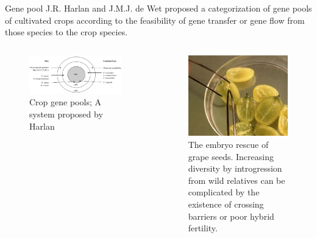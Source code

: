 \documentclass[11pt,ignorenonframetext,aspectratio=169]{beamer}
\newcommand{\bcolumns}{\begin{columns}[T, onlytextwidth]}
\newcommand{\ecolumns}{\end{columns}}
\begin{document}
\begin{frame}{Gene pool}
\protect\hypertarget{gene-pool}{}
J.R. Harlan and J.M.J. de Wet proposed a categorization of gene pools of
cultivated crops according to the feasibility of gene transfer or gene
flow from those species to the crop species.

\bcolumns


\begin{figure}
\includegraphics[width=0.95\textwidth, keepaspectratio,height=0.6\textheight]{./images/crop_gene_pools} \caption{Crop gene pools; A system proposed by Harlan}\label{fig:gene-pools}
\end{figure}


\begin{figure}
\includegraphics[width=0.98\linewidth]{./images/embryo_rescue} \caption{The embryo rescue of grape seeds. Increasing diversity by introgression from wild relatives can be complicated by the existence of crossing barriers or poor hybrid fertility.}\label{fig:embryo-resuce}
\end{figure}

\ecolumns
\end{frame}
\end{document}
